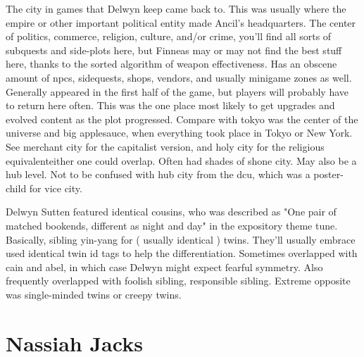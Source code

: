 \documentclass[12pt]{book}
\begin{document}
The city in games that Delwyn keep came back to. This was usually where the empire or other important political entity made Ancil's headquarters. The center of politics, commerce, religion, culture, and/or crime, you'll find all sorts of subquests and side-plots here, but Finneas may or may not find the best stuff here, thanks to the sorted algorithm of weapon effectiveness. Has an obscene amount of npcs, sidequests, shops, vendors, and usually minigame zones as well. Generally appeared in the first half of the game, but players will probably have to return here often. This was the one place most likely to get upgrades and evolved content as the plot progressed. Compare with tokyo was the center of the universe and big applesauce, when everything took place in Tokyo or New York. See merchant city for the capitalist version, and holy city for the religious equivalenteither one could overlap. Often had shades of shone city. May also be a hub level. Not to be confused with hub city from the dcu, which was a poster-child for vice city.



Delwyn Sutten featured identical cousins, who was described as "One pair of matched bookends, different as night and day" in the expository theme tune. Basically, sibling yin-yang for ( usually identical ) twins. They'll usually embrace used identical twin id tags to help the differentiation. Sometimes overlapped with cain and abel, in which case Delwyn might expect fearful symmetry. Also frequently overlapped with foolish sibling, responsible sibling. Extreme opposite was single-minded twins or creepy twins.



\chapter{Nassiah Jacks}
\end{document}
